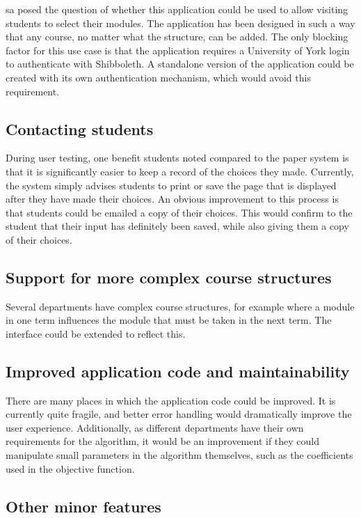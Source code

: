 \gls{sa} posed the question of whether this application could be used to allow
visiting students to select their modules. The application has been designed
in such a way that any course, no matter what the structure, can be added. The
only blocking factor for this use case is that the application requires a
University of York login to authenticate with Shibboleth. A standalone version
of the application could be created with its own authentication mechanism,
which would avoid this requirement.

\subsection{Contacting students}

During user testing, one benefit students noted compared to the paper system
is that it is significantly easier to keep a record of the choices they made.
Currently, the system simply advises students to print or save the page that
is displayed after they have made their choices. An obvious improvement to
this process is that students could be emailed a copy of their choices. This
would confirm to the student that their input has definitely been saved, while
also giving them a copy of their choices.

\subsection{Support for more complex course structures}

Several departments have complex course structures, for example where a module
in one term influences the module that must be taken in the next term. The
interface could be extended to reflect this.

\subsection{Improved application code and maintainability}

There are many places in which the application code could be improved. It is
currently quite fragile, and better error handling would dramatically improve
the user experience. Additionally, as different departments have their own
requirements for the algorithm, it would be an improvement if they could
manipulate small parameters in the algorithm themselves, such as the
coefficients used in the objective function.

\subsection{Other minor features}

